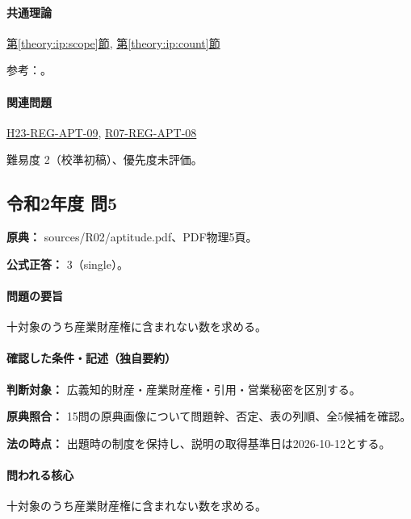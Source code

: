 \paragraph{共通理論} \hyperref[theory:ip:scope]{第\ref*{theory:ip:scope}節}, \hyperref[theory:ip:count]{第\ref*{theory:ip:count}節}

\par 参考：\cite{ip_industrial_four,ip_broad_scope}。

\paragraph{関連問題} \hyperref[q:h23-reg-apt-09]{H23-REG-APT-09}, \hyperref[q:r07-reg-apt-08]{R07-REG-APT-08}

\par 難易度 2（校準初稿）、優先度未評価。

\subsection{令和2年度 問5}
\label{q:r02-reg-apt-05}

\noindent\textbf{原典：} sources/R02/aptitude.pdf、PDF物理5頁。

\textbf{公式正答：} 3（single）。

\paragraph{問題の要旨} 十対象のうち産業財産権に含まれない数を求める。

\paragraph{確認した条件・記述（独自要約）}\mbox{}\par

\noindent\textbf{判断対象：} 広義知的財産・産業財産権・引用・営業秘密を区別する。\par

\noindent\textbf{原典照合：} 15問の原典画像について問題幹、否定、表の列順、全5候補を確認。\par

\noindent\textbf{法の時点：} 出題時の制度を保持し、説明の取得基準日は2026-10-12とする。\par

\paragraph{問われる核心} 十対象のうち産業財産権に含まれない数を求める。

